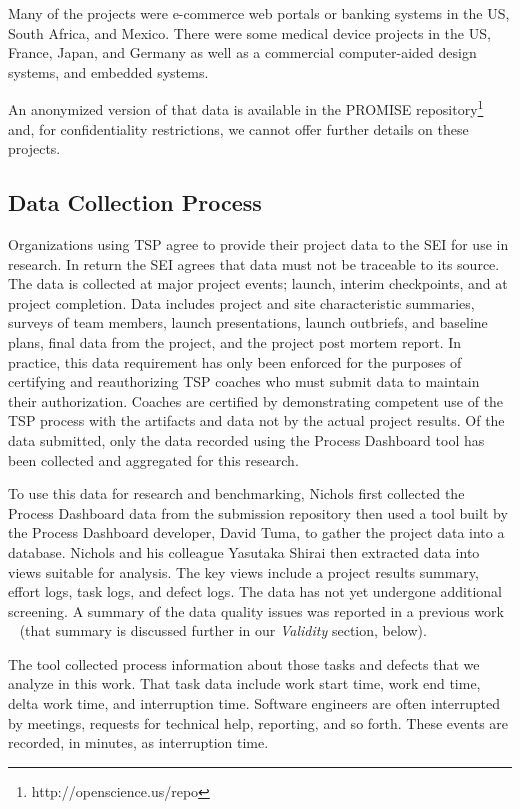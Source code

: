 Many of the projects were e-commerce web portals or banking systems in the US, South Africa, and Mexico. 
There were  some  medical device projects in  the US, France, Japan, and Germany as well  as a commercial computer-aided design systems, and embedded systems. 

An anonymized version of that data is available in the PROMISE repository\footnote{http://openscience.us/repo}  and,
for confidentiality restrictions, we cannot offer 
further details on these projects.



\subsection{Data Collection Process}
\label{sec:data-collection}

Organizations using TSP agree to provide their project data to the SEI for use in research. In return the SEI agrees    that  data must not be traceable to its source. The data is collected at major project events; launch, interim checkpoints, and at project completion. Data includes project and site  characteristic summaries, surveys of team members, launch presentations, launch outbriefs, and baseline plans, final data from the project, and the project post mortem report.  In practice, this data requirement has only been enforced for the purposes of certifying and reauthorizing TSP coaches who must submit data to maintain their authorization. Coaches are certified by demonstrating competent use of the TSP process with the artifacts and data not by the actual project results.  Of the data submitted, only the data recorded using the Process Dashboard tool has been collected and aggregated for this research. 

To use this data for research and benchmarking,  Nichols first collected the Process Dashboard data from the submission repository then used a tool built by the Process Dashboard developer, David Tuma, 
to gather the project data into a database. Nichols and his colleague Yasutaka Shirai then extracted data into views suitable for analysis. The key views include a project results summary, effort logs, task logs, and defect logs. The data has not yet undergone additional screening. A summary of the data quality issues was reported in a previous work ~\cite{shirai14} (that summary is discussed further in our {\em Validity} section, below).

The tool collected process information about those tasks and defects that we analyze in this work. 
That task data include  work start time, work end time, delta
work time, and interruption time. Software engineers are often
interrupted by meetings, requests for technical help, reporting, and
so forth. These events are recorded, in minutes, as interruption
time. 

